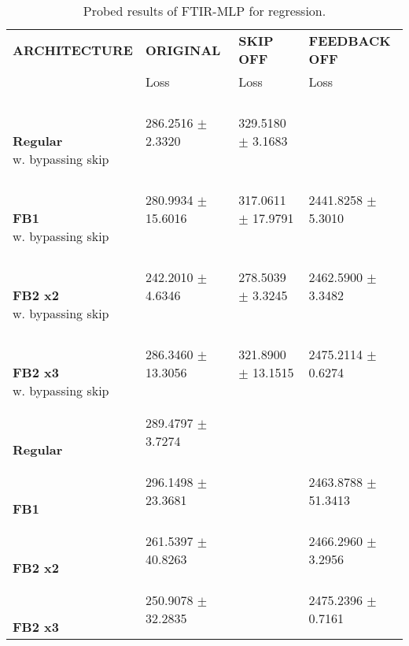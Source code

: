
\begin{table}[h]
    \centering
    \begin{tabular}{|>{\columncolor{gray!05}}l|l|l|l|}
        \hline
        \rowcolor{gray!20}
        \textbf{\footnotesize ARCHITECTURE} & \textbf{\footnotesize ORIGINAL} & \textbf{\footnotesize SKIP OFF} & \textbf{\footnotesize FEEDBACK OFF} \\

        \rowcolor{gray!20}
        & {\footnotesize Loss} & {\footnotesize Loss} & {\footnotesize Loss} \\
        \hline
\shortstack[l]{\\ {} \\ \textbf{Regular}\\{w. bypassing skip}} & 286.2516 $\pm$ 2.3320 & 329.5180 $\pm$ 3.1683 &  \\
 \hline 
\shortstack[l]{\\ {} \\ \textbf{FB1}\\{w. bypassing skip}} & 280.9934 $\pm$ 15.6016 & 317.0611 $\pm$ 17.9791 & 2441.8258 $\pm$ 5.3010 \\
 \hline 
\shortstack[l]{\\ {} \\ \textbf{FB2 x2}\\{w. bypassing skip}} & 242.2010 $\pm$ 4.6346 & 278.5039 $\pm$ 3.3245 & 2462.5900 $\pm$ 3.3482 \\
 \hline 
\shortstack[l]{\\ {} \\ \textbf{FB2 x3}\\{w. bypassing skip}} & 286.3460 $\pm$ 13.3056 & 321.8900 $\pm$ 13.1515 & 2475.2114 $\pm$ 0.6274 \\
 \hline 
\shortstack[l]{\\ {} \\ \textbf{Regular}\\{}} & 289.4797 $\pm$ 3.7274 &  &  \\
 \hline 
\shortstack[l]{\\ {} \\ \textbf{FB1}\\{}} & 296.1498 $\pm$ 23.3681 &  & 2463.8788 $\pm$ 51.3413 \\
 \hline 
\shortstack[l]{\\ {} \\ \textbf{FB2 x2}\\{}} & 261.5397 $\pm$ 40.8263 &  & 2466.2960 $\pm$ 3.2956 \\
 \hline 
\shortstack[l]{\\ {} \\ \textbf{FB2 x3}\\{}} & 250.9078 $\pm$ 32.2835 &  & 2475.2396 $\pm$ 0.7161 \\
 \hline 

    \end{tabular}
    \caption{Probed results of FTIR-MLP for regression.}
    \label{tab:ftir-mlp-regression}
\end{table}
